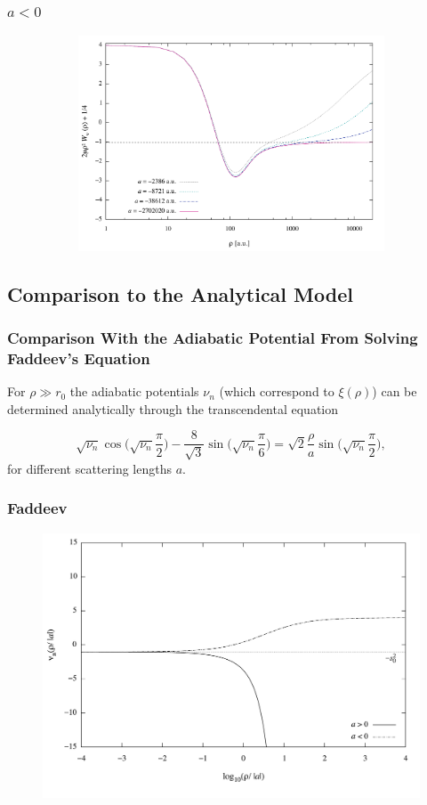 \documentclass[hideothersubsections]{beamer}
\begin{document}
\begin{frame}
\frametitle{$a<0$}
\begin{figure}
	\begin{figure}
		\includegraphics[width=0.8\linewidth]{finite_negative_a.pdf}
	\end{figure}
\end{figure}
\end{frame}

\subsection{Comparison to the Analytical Model}
\begin{frame}
\frametitle{Comparison With the Adiabatic Potential From Solving Faddeev's Equation}
For $\rho \gg r_0$ the adiabatic potentials $\nu_n$ (which correspond to $ \xi(\rho)$) can be determined analytically through the transcendental equation

\begin{equation}\label{eq:transcendental}
\sqrt{\nu_n} \cos{\bigg(\sqrt{\nu_n} \frac{\pi}{2}\bigg)} - \frac{8}{\sqrt{3}}\sin{\bigg(\sqrt{\nu_n} \frac{\pi}{6}\bigg)} = \sqrt{2}\frac{\rho}{a}\sin{\bigg(\sqrt{\nu_n} \frac{\pi}{2}\bigg)}, 
\end{equation}
for different scattering lengths $a$.
\end{frame}

\begin{frame}
\frametitle{Faddeev}
	\begin{figure}
		\includegraphics[width=0.8\linewidth]{faddeev.pdf}
	\end{figure}
\end{frame}


\end{document}
